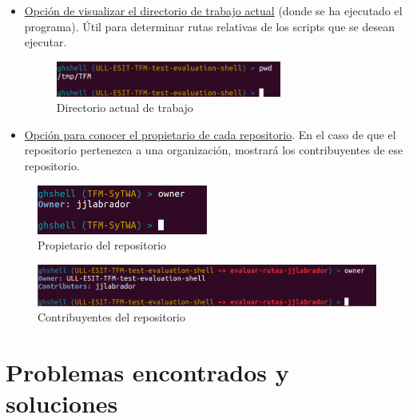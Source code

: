 \begin{itemize}
	\item \underline{Opción de visualizar el directorio de trabajo actual} (donde se ha ejecutado el programa). Útil para determinar rutas relativas de los scripts que se desean ejecutar.
	
		\begin{figure}[H]
		\begin{center}
		\includegraphics[width=0.7\textwidth]{images/pwd}
		\caption{Directorio actual de trabajo}
		\label{fig:pwd}
		\end{center}
		\end{figure}
	
	
	\item \underline{Opción para conocer el propietario de cada repositorio}. En el caso de que el repositorio pertenezca a una organización, mostrará los contribuyentes de ese repositorio.
\end{itemize}

		\begin{figure}[H]
		\begin{center}
		\includegraphics[width=0.5\textwidth]{images/owner1-1}
		\caption{Propietario del repositorio}
		\label{fig:owner1-1}
		\end{center}
		\end{figure}
		
		\begin{figure}[H]
		\begin{center}
		\includegraphics[width=1\textwidth]{images/owner1-2}
		\caption{Contribuyentes del repositorio}
		\label{fig:owner1-2}
		\end{center}
		\end{figure}

\newpage	
\section{Problemas encontrados y soluciones}
\label{3:sec:3}

